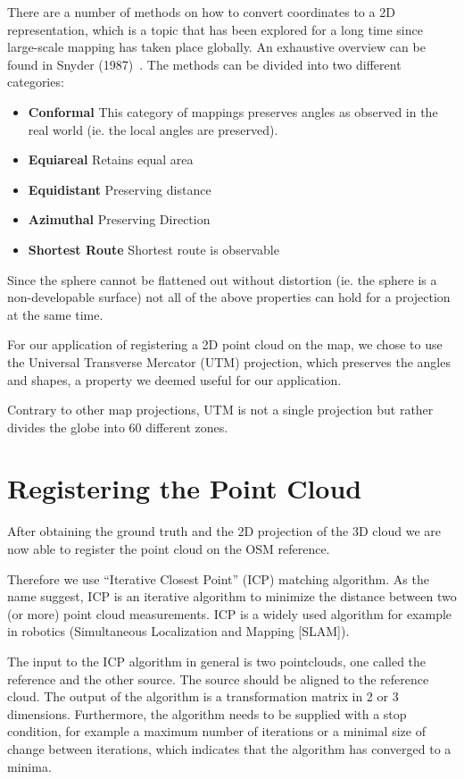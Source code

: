 \documentclass[10pt,twocolumn,letterpaper]{article}
\begin{document}
There are a number of methods on how to convert coordinates to a 2D representation, which is a topic that has been explored for a long time since large-scale mapping has taken place globally. An exhaustive overview can be found in Snyder (1987)~\cite{Snyder1987}. The methods can be divided into two different categories:

\begin{itemize}
   \item \textbf{Conformal} This category of mappings preserves angles as observed in the real world (ie. the local angles are preserved). 
   \item \textbf{Equiareal} Retains equal area
   \item \textbf{Equidistant} Preserving distance
   \item \textbf{Azimuthal} Preserving Direction
   \item \textbf{Shortest Route} Shortest route is observable 
\end{itemize}

Since the sphere cannot be flattened out without distortion (ie. the sphere is a non-developable surface) not all of the above properties can hold for a projection at the same time.

For our application of registering a 2D point cloud on the map, we chose to use the Universal Transverse Mercator (UTM) projection, which preserves the angles and shapes, a property we deemed useful for our application.

Contrary to other map projections, UTM is not a single projection but rather divides the globe into 60 different zones.

\section{Registering the Point Cloud}

After obtaining the ground truth and the 2D projection of the 3D cloud we are now able to register the point cloud on the OSM reference.

Therefore we use ``Iterative Closest Point'' (ICP) matching algorithm. As the name suggest, ICP is an iterative algorithm to minimize the distance between two (or more) point cloud measurements. ICP is a widely used algorithm for example in robotics (Simultaneous Localization and Mapping [SLAM]). 

The input to the ICP algorithm in general is two pointclouds, one called the reference and the other source. The source should be aligned to the reference cloud. The output of the algorithm is a transformation matrix in 2 or 3 dimensions. Furthermore, the algorithm needs to be supplied with a stop condition, for example a maximum number of iterations or a minimal size of change between iterations, which indicates that the algorithm has converged to a minima.
\end{document}
